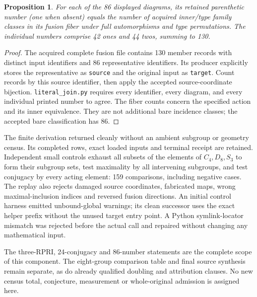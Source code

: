 \documentclass[11pt]{article}
\newtheorem{proposition}{Proposition}
\begin{document}
\begin{proposition}
For each of the 86 displayed diagrams, its retained parenthetic number
(one when absent) equals the number of acquired inner/type family
classes in its fusion fiber under full automorphisms and type permutations. The individual
numbers comprise 42 ones and 44 twos, summing to 130.
\end{proposition}
\begin{proof}
The acquired complete fusion file contains 130 member records with
distinct input identifiers and 86 representative identifiers. Its
producer explicitly stores the representative as \texttt{source} and
the original input as \texttt{target}. Count records by this source
identifier, then apply the accepted source-coordinate bijection.
\texttt{literal\_join.py} requires every identifier, every diagram,
and every individual printed number to agree. The fiber counts concern
the specified action and its inner equivalence. They are not additional
bare incidence classes; the accepted bare classification has 86.
\end{proof}

The finite derivation returned cleanly without an ambient
subgroup or geometry census. Its completed rows, exact loaded inputs
and terminal receipt are retained. Independent small controls exhaust
all subsets of the elements of $C_4,D_8,S_3$ to form their subgroup
sets, test maximality by all intervening subgroups, and test conjugacy
by every acting element: 159 comparisons, including negative cases.
The replay also rejects damaged source coordinates, fabricated maps,
wrong maximal-inclusion indices and reversed fusion directions.
An initial control harness emitted unbound-global warnings; its clean
successor uses the exact helper prefix without the unused target
entry point. A Python symlink-locator mismatch was rejected before
the actual call and repaired without changing any mathematical input.

The three-RPRI, 24-conjugacy and 86-number statements are the complete
scope of this component. The eight-group comparison table and final
source synthesis remain separate, as do already qualified doubling
and attribution clauses. No new census total, conjecture, measurement
or whole-original admission is assigned here.
\end{document}
